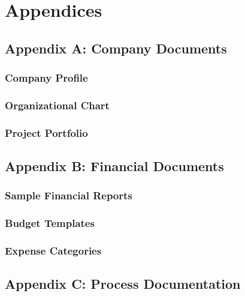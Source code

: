 
\chapter{Appendices}

\section{Appendix A: Company Documents}

\subsection{Company Profile}

\subsection{Organizational Chart}

\subsection{Project Portfolio}

\section{Appendix B: Financial Documents}

\subsection{Sample Financial Reports}

\subsection{Budget Templates}

\subsection{Expense Categories}

\section{Appendix C: Process Documentation}

